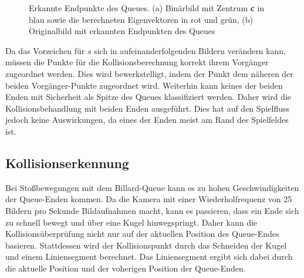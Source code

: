 \begin{figure}[H]
	\label{fig:thresholded}
	\centering
	\caption{Erkannte Endpunkte des Queues. (a) Binärbild mit Zentrum \textbf{c} in blau sowie die berechneten Eigenvektoren in rot und grün, (b) Originalbild mit erkannten Endpunkten des Queues}
\end{figure}


Da das Vorzeichen für $s$ sich in aufeinanderfolgenden Bildern verändern kann, müssen die Punkte für die Kollisionsberechnung korrekt ihrem Vorgänger zugeordnet werden.
Dies wird bewerkstelligt, indem der Punkt dem näheren der beiden Vorgänger-Punkte zugeordnet wird.
Weiterhin kann keines der beiden Enden mit Sicherheit als Spitze des Queues klassifiziert werden.
Daher wird die Kollisionsbehandlung mit beiden Enden ausgeführt.
Dies hat auf den Spielfluss jedoch keine Auswirkungen, da eines der Enden meist am Rand des Spielfeldes ist.

\subsection{Kollisionserkennung}

Bei Stoßbewegungen mit dem Billard-Queue kann es zu hohen Geschwindigkeiten der Queue-Enden kommen. 
Da die Kamera mit einer Wiederholfrequenz von 25 Bildern pro Sekunde Bildaufnahmen macht, kann es passieren, dass ein Ende sich zu schnell bewegt und über eine Kugel hinwegspringt. 
Daher kann die Kollisionsüberprüfung nicht nur auf der aktuellen Position des Queue-Endes basieren.
Stattdessen wird der Kollisionspunkt durch das Schneiden der Kugel und einem  Liniensegment berechnet. 
Das Liniensegment ergibt sich dabei durch die aktuelle Position und der voherigen Position der Queue-Enden.


